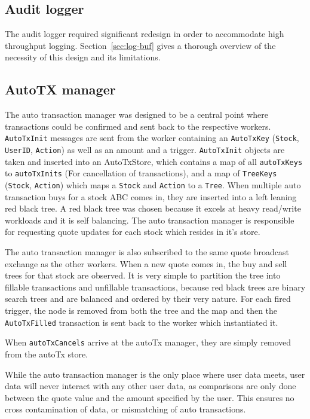 \subsection{Audit logger}
The audit logger required significant redesign in order to accommodate high throughput logging. Section~\ref{sec:log-buf} gives a thorough overview of the necessity of this design and its limitations.

\subsection{AutoTX manager}
The auto transaction manager was designed to be a central point where transactions could be confirmed and sent back to the respective workers. \texttt{AutoTxInit} messages are sent from the worker containing an \texttt{AutoTxKey} (\texttt{Stock}, \texttt{UserID}, \texttt{Action}) as well as an amount and a trigger. \texttt{AutoTxInit} objects are taken and inserted into an AutoTxStore, which contains a map of all \texttt{autoTxKeys} to \texttt{autoTxInits} (For cancellation of transactions), and a map of \texttt{TreeKeys} (\texttt{Stock}, \texttt{Action}) which maps a \texttt{Stock} and \texttt{Action} to a \texttt{Tree}. When multiple auto transaction buys for a stock ABC comes in, they are inserted into a left leaning red black tree. A red black tree was chosen because it excels at heavy read/write workloads and it is self balancing. The auto transaction manager is responsible for requesting quote updates for each stock which resides in it’s store.

The auto transaction manager is also subscribed to the same quote broadcast exchange as the other workers. When a new quote comes in, the buy and sell trees for that stock are observed. It is very simple to partition the tree into fillable transactions and unfillable transactions, because red black trees are binary search trees and are balanced and ordered by their very nature. For each fired trigger, the node is removed from both the tree and the map and then the \texttt{AutoTxFilled} transaction is sent back to the worker which instantiated it.

When \texttt{autoTxCancels} arrive at the autoTx manager, they are simply removed from the autoTx store.

While the auto transaction manager is the only place where user data meets, user data will never interact with any other user data, as comparisons are only done between the quote value and the amount specified by the user. This ensures no cross contamination of data, or mismatching of auto transactions.

